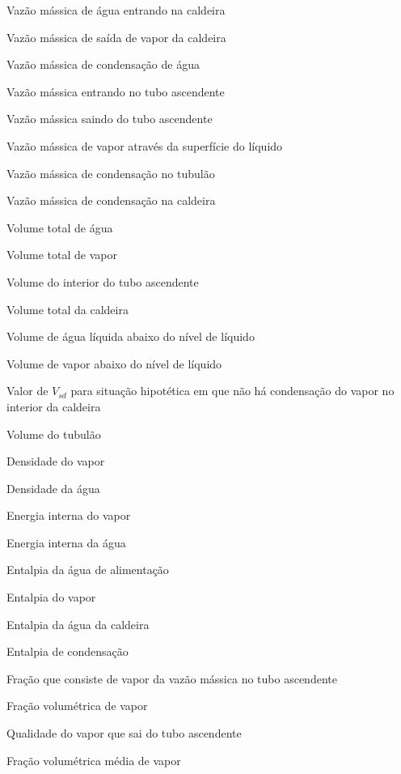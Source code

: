   \item[$ q_f $] Vazão mássica de água entrando na caldeira
  \item[$ q_s $] Vazão mássica de saída de vapor da caldeira
  \item[$ q_{ct} $] Vazão mássica de condensação de água
  \item[$ q_{dc} $] Vazão mássica entrando no tubo ascendente
  \item[$ q_r $] Vazão mássica saindo do tubo ascendente
  \item[$ q_{sd} $] Vazão mássica de vapor através da superfície do
  líquido
  \item[$ q_{cd} $] Vazão mássica de condensação no tubulão
  \item[$ q_{ct} $] Vazão mássica de condensação na caldeira

  \item[$ V_{wt} $] Volume total de água
  \item[$ V_{st} $] Volume total de vapor
  \item[$ V_r $] Volume do interior do tubo ascendente
  \item[$ V_t $] Volume total da caldeira
  \item[$ V_{wd} $] Volume de água líquida abaixo do nível de líquido
  \item[$ V_{sd} $] Volume de vapor abaixo do nível de líquido
  \item[$ V_{sd}^0 $] Valor de $V_{sd}$ para situação hipotética em
  que não há condensação do vapor no interior da caldeira
  \item[$ V_d $] Volume do tubulão

  \item[$ \rho_s $] Densidade do vapor
  \item[$ \rho_w $] Densidade da água
  
  \item[$ u_s $] Energia interna do vapor
  \item[$ u_w $] Energia interna da água
  
  \item[$ h_f $] Entalpia da água de alimentação
  \item[$ h_s $] Entalpia do vapor
  \item[$ h_w $] Entalpia da água da caldeira
  \item[$ h_c $] Entalpia de condensação

  \item[$ \alpha_m $] Fração que consiste de vapor da vazão mássica no
  tubo ascendente
  \item[$ \alpha_v $] Fração volumétrica de vapor
  \item[$ \alpha_r $] Qualidade do vapor que sai do tubo ascendente
  \item[$ \bar{\alpha_v} $] Fração volumétrica média de vapor

